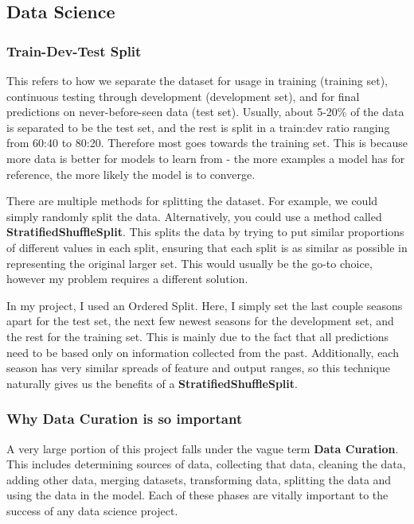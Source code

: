 \documentclass[12pt,a4paper,twoside,openright]{report}
\begin{document}
\subsection{Data Science}

\subsubsection{Train-Dev-Test Split}

This refers to how we separate the dataset for usage in training (training set), continuous testing through development (development set), and for final predictions on never-before-seen data (test set). Usually, about 5-20\% of the data is separated to be the test set, and the rest is split in a train:dev ratio ranging from 60:40 to 80:20. Therefore most goes towards the training set. This is because more data is better for models to learn from - the more examples a model has for reference, the more likely the model is to converge.

There are multiple methods for splitting the dataset. For example, we could simply randomly split the data. Alternatively, you could use a method called \textbf{StratifiedShuffleSplit}. This splits the data by trying to put similar proportions of different values in each split, ensuring that each split is as similar as possible in representing the original larger set. This would usually be the go-to choice, however my problem requires a different solution.

In my project, I used an Ordered Split. Here, I simply set the last couple seasons apart for the test set, the next few newest seasons for the development set, and the rest for the training set. This is mainly due to the fact that all predictions need to be based only on information collected from the past. Additionally, each season has very similar spreads of feature and output ranges, so this technique naturally gives us the benefits of a \textbf{StratifiedShuffleSplit}.

\subsubsection{Why Data Curation is so important}

A very large portion of this project falls under the vague term \textbf{Data Curation}. This includes determining sources of data, collecting that data, cleaning the data, adding other data, merging datasets, transforming data, splitting the data and using the data in the model. Each of these phases are vitally important to the success of any data science project.
\end{document}
